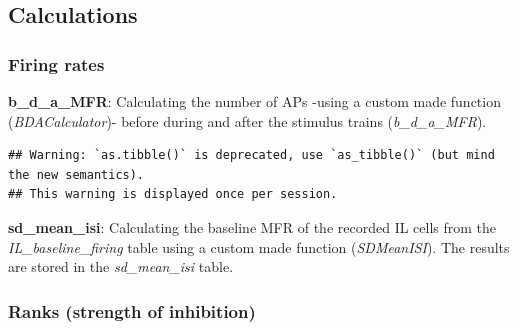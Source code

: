 \documentclass[12pt,]{article}
\newenvironment{Shaded}{\begin{snugshade}}{\end{snugshade}}
\newcommand{\DataTypeTok}[1]{\textcolor[rgb]{0.13,0.29,0.53}{#1}}
\newcommand{\KeywordTok}[1]{\textcolor[rgb]{0.13,0.29,0.53}{\textbf{#1}}}
\newcommand{\NormalTok}[1]{#1}
\newcommand{\OperatorTok}[1]{\textcolor[rgb]{0.81,0.36,0.00}{\textbf{#1}}}
\newcommand{\StringTok}[1]{\textcolor[rgb]{0.31,0.60,0.02}{#1}}
\begin{document}
\hypertarget{htmlwidget-969bf125be8db52e7d35}{}

\hypertarget{calculations}{%
\subsection{Calculations}\label{calculations}}

\hypertarget{firing-rates}{%
\subsubsection{Firing rates}\label{firing-rates}}

\textbf{b\_d\_a\_MFR}: Calculating the number of APs -using a custom
made function (\emph{BDACalculator})- before during and after the
stimulus trains (\emph{b\_d\_a\_MFR}).

\begin{Shaded}
\end{Shaded}

\begin{verbatim}
## Warning: `as.tibble()` is deprecated, use `as_tibble()` (but mind the new semantics).
## This warning is displayed once per session.
\end{verbatim}

\textbf{sd\_mean\_isi}: Calculating the baseline MFR of the recorded IL
cells from the \emph{IL\_baseline\_firing} table using a custom made
function (\emph{SDMeanISI}). The results are stored in the
\emph{sd\_mean\_isi} table.

\hypertarget{ranks-strength-of-inhibition}{%
\subsubsection{Ranks (strength of
inhibition)}\label{ranks-strength-of-inhibition}}
\end{document}
